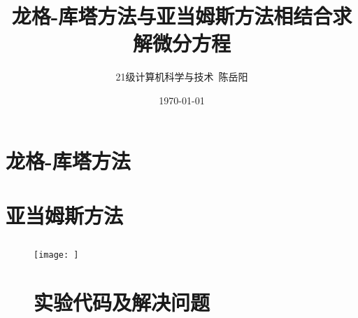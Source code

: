 \documentclass{article}
\title{龙格-库塔方法与亚当姆斯方法相结合求解微分方程}
\author{21级计算机科学与技术\ 陈岳阳}
\date{\today}
\begin{document}
\maketitle
\tableofcontents

\section{龙格-库塔方法}
  \subsection{}
    \subsubsection{}

\section{亚当姆斯方法}
  \subsection{}
\begin{figure}[htbp]
	\centering
	\texttt{[image: ]}
	\caption{}

\section{实验代码及解决问题}

\end{figure}
\end{document}
